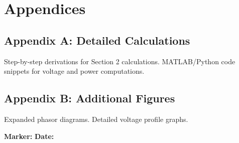 \documentclass[conference]{IEEEtran}
\begin{document}
\section*{Appendices}
\subsection*{Appendix A: Detailed Calculations}
Step-by-step derivations for Section 2 calculations. MATLAB/Python code snippets for voltage and power computations.

\subsection*{Appendix B: Additional Figures}
Expanded phasor diagrams. Detailed voltage profile graphs.


\vfill
\noindent \textbf{Marker:} \hfill \textbf{Date:}
\end{document}
